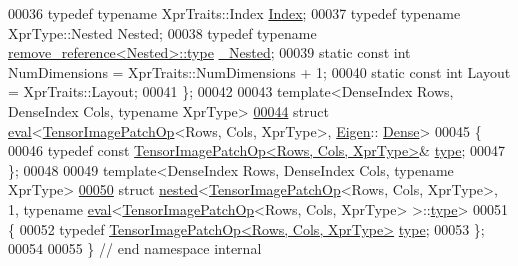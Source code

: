 \begin{DoxyCode}
00036   \textcolor{keyword}{typedef} \textcolor{keyword}{typename} XprTraits::Index \hyperlink{namespace_eigen_a62e77e0933482dafde8fe197d9a2cfde}{Index};
00037   \textcolor{keyword}{typedef} \textcolor{keyword}{typename} XprType::Nested Nested;
00038   \textcolor{keyword}{typedef} \textcolor{keyword}{typename} \hyperlink{group___sparse_core___module}{remove\_reference<Nested>::type} 
      \hyperlink{group___sparse_core___module}{\_Nested};
00039   \textcolor{keyword}{static} \textcolor{keyword}{const} \textcolor{keywordtype}{int} NumDimensions = XprTraits::NumDimensions + 1;
00040   \textcolor{keyword}{static} \textcolor{keyword}{const} \textcolor{keywordtype}{int} Layout = XprTraits::Layout;
00041 \};
00042 
00043 \textcolor{keyword}{template}<DenseIndex Rows, DenseIndex Cols, \textcolor{keyword}{typename} XprType>
\hyperlink{struct_eigen_1_1internal_1_1eval_3_01_tensor_image_patch_op_3_01_rows_00_01_cols_00_01_xpr_type_01_4_00_01_eigen_1_1_dense_01_4}{00044} \textcolor{keyword}{struct }\hyperlink{struct_eigen_1_1internal_1_1eval}{eval}<\hyperlink{class_eigen_1_1_tensor_image_patch_op}{TensorImagePatchOp}<Rows, Cols, XprType>, \hyperlink{namespace_eigen}{Eigen}::
      \hyperlink{struct_eigen_1_1_dense}{Dense}>
00045 \{
00046   \textcolor{keyword}{typedef} \textcolor{keyword}{const} \hyperlink{class_eigen_1_1_tensor_image_patch_op}{TensorImagePatchOp<Rows, Cols, XprType>}& 
      \hyperlink{class_eigen_1_1_tensor_image_patch_op}{type};
00047 \};
00048 
00049 \textcolor{keyword}{template}<DenseIndex Rows, DenseIndex Cols, \textcolor{keyword}{typename} XprType>
\hyperlink{struct_eigen_1_1internal_1_1nested_3_01_tensor_image_patch_op_3_01_rows_00_01_cols_00_01_xpr_typbdbaf7e5a7b5b77870e0e3f45395b2a8}{00050} \textcolor{keyword}{struct }\hyperlink{struct_eigen_1_1internal_1_1nested}{nested}<\hyperlink{class_eigen_1_1_tensor_image_patch_op}{TensorImagePatchOp}<Rows, Cols, XprType>, 1, typename 
      \hyperlink{struct_eigen_1_1internal_1_1eval}{eval}<\hyperlink{class_eigen_1_1_tensor_image_patch_op}{TensorImagePatchOp}<Rows, Cols, XprType> >::\hyperlink{class_eigen_1_1_tensor_image_patch_op}{type}>
00051 \{
00052   \textcolor{keyword}{typedef} \hyperlink{class_eigen_1_1_tensor_image_patch_op}{TensorImagePatchOp<Rows, Cols, XprType>} 
      \hyperlink{class_eigen_1_1_tensor_image_patch_op}{type};
00053 \};
00054 
00055 \}  \textcolor{comment}{// end namespace internal}

\end{DoxyCode}
